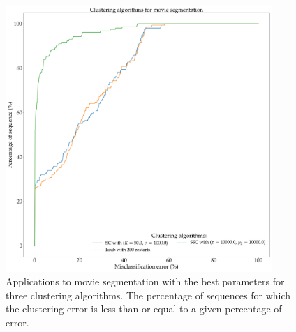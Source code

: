 \documentclass[12pt,a4paper,onecolumn]{article}
\begin{document}
\begin{figure}
	\centering
	\includegraphics[width = 0.9\textwidth]{auc_compare}
	\caption{Applications to movie segmentation with the best parameters for three clustering algorithms. The percentage of sequences for which the clustering error is less than or equal to a given percentage of error.}
	\label{fig_motion_auc_compare_res}
\end{figure}


\printbibliography
\end{document}
